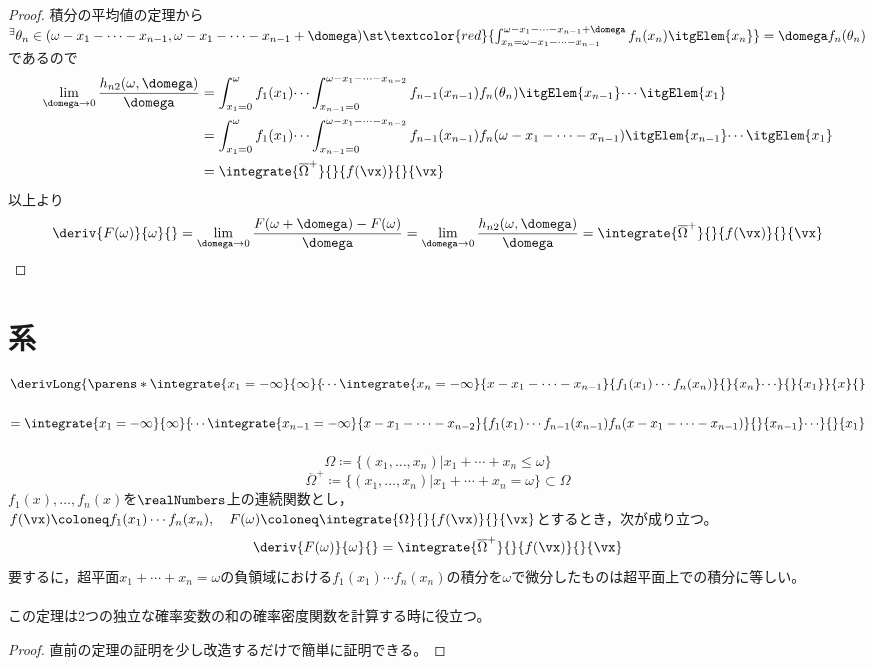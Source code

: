 \begin{proof}
            積分の平均値の定理から$^\exists\theta_n\in(\omega-x_1-\dotsb-x_{n-1},\omega-x_1-\dotsb-x_{n-1}+\domega)\st\textcolor{red}{\int_{x_n=\omega-x_1-\dotsb-x_{n-1}}^{\omega-x_1-\dotsb-x_{n-1}+\domega}f_n(x_n)\itgElem{x_n}} = \domega f_n(\theta_n)$であるので
            \begin{align*}
                \lim_{\domega\to 0}\frac{h_{n2}(\omega,\domega)}{\domega} &= \int_{x_1=0}^{\omega}f_1(x_1)\dotsi\int_{x_{n-1}=0}^{\omega-x_1-\dotsb-x_{n-2}}f_{n-1}(x_{n-1})f_n(\theta_n)\itgElem{x_{n-1}}\dotsi\itgElem{x_1} \\
                &= \int_{x_1=0}^{\omega}f_1(x_1)\dotsi\int_{x_{n-1}=0}^{\omega-x_1-\dotsb-x_{n-2}}f_{n-1}(x_{n-1})f_n(\omega-x_1-\dotsb-x_{n-1})\itgElem{x_{n-1}}\dotsi\itgElem{x_1} \\
                &= \integrate{\overline{\Omega}^+}{}{f(\vx)}{}{\vx}
            \end{align*}
            以上より
            \[\deriv{F(\omega)}{\omega}{} = \lim_{\domega \to 0}\frac{F(\omega+\domega)-F(\omega)}{\domega} = \lim_{\domega\to 0}\frac{h_{n2}(\omega,\domega)}{\domega} = \integrate{\overline{\Omega}^+}{}{f(\vx)}{}{\vx}\]
        \end{proof}
    \section{
        系\texorpdfstring{\\}{}
        \small{
            \texorpdfstring{$\derivLong{\parens*{\integrate{x_1=-\infty}{\infty}{\dotsi\integrate{x_n=-\infty}{x-x_1-\dotsb-x_{n-1}}{f_1(x_1)\dotsm f_n(x_n)}{}{x_n}\dotsi}{}{x_1}}}{x}{}$\\}{}
            \texorpdfstring{$= \integrate{x_1=-\infty}{\infty}{\dotsi\integrate{x_{n-1}=-\infty}{x-x_1-\dotsb-x_{n-2}}{f_1(x_1)\dotsm f_{n-1}(x_{n-1})f_n(x-x_1-\dotsb-x_{n-1})}{}{x_{n-1}}\dotsi}{}{x_1}$}{}
        }
    }
        \label{重積分の微分の系}
        \begin{shadebox}
            \[\Omega\coloneq\{(x_1,\dotsc,x_n)|x_1+\dotsb+x_n \leq \omega\}\]
            \[\overline{\Omega}^+\coloneq\{(x_1,\dotsc,x_n)|x_1+\dotsb+x_n = \omega\} \subset \Omega\]
            $f_1(x),\dotsc,f_n(x)$を$\realNumbers$上の連続関数とし，$f(\vx)\coloneq f_1(x_1)\dotsm f_n(x_n),\quad F(\omega) \coloneq \integrate{\Omega}{}{f(\vx)}{}{\vx}$とするとき，次が成り立つ。
            \[\deriv{F(\omega)}{\omega}{} = \integrate{\overline{\Omega}^+}{}{f(\vx)}{}{\vx}\]
            要するに，超平面$x_1+\dotsb+x_n=\omega$の負領域における$f_1(x_1)\dotsm f_n(x_n)$の積分を$\omega$で微分したものは超平面上での積分に等しい。\\
            \\
            \quad この定理は2つの独立な確率変数の和の確率密度関数を計算する時に役立つ。
        \end{shadebox}
        \begin{proof}
            直前の定理の証明を少し改造するだけで簡単に証明できる。
        \end{proof}